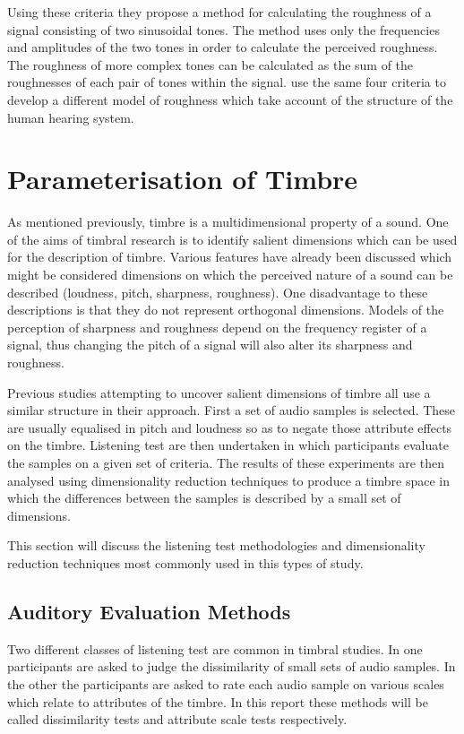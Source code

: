 	Using these criteria they propose a method for calculating the roughness of a signal consisting of two sinusoidal
	tones. The method uses only the frequencies and amplitudes of the two tones in order to calculate the perceived
	roughness. The roughness of more complex tones can be calculated as the sum of the roughnesses of each pair of tones
	within the signal. \citet{fastl2007psychoacoustics} use the same four criteria to develop a different model of
	roughness which take account of the structure of the human hearing system.

\section{Parameterisation of Timbre}
\label{sec:Timbre-Parameterisation}
	As mentioned previously, timbre is a multidimensional property of a sound. One of the aims of timbral research is to
	identify salient dimensions which can be used for the description of timbre. Various features have already been
	discussed which might be considered dimensions on which the perceived nature of a sound can be described (loudness,
	pitch, sharpness, roughness). One disadvantage to these descriptions is that they do not represent orthogonal
	dimensions. Models of the perception of sharpness and roughness depend on the frequency register of a signal, thus
	changing the pitch of a signal will also alter its sharpness and roughness.

	Previous studies attempting to uncover salient dimensions of timbre all use a similar structure in their approach.
	First a set of audio samples is selected. These are usually equalised in pitch and loudness so as to negate those
	attribute effects on the timbre. Listening test are then undertaken in which participants evaluate the samples on a
	given set of criteria. The results of these experiments are then analysed using dimensionality reduction techniques
	to produce a timbre space in which the differences between the samples is described by a small set of dimensions.

	This section will discuss the listening test methodologies and dimensionality reduction techniques most commonly
	used in this types of study.

	\subsection{Auditory Evaluation Methods}
	\label{sec:Timbre-AuditoryEvaluation}
		Two different classes of listening test are common in timbral studies. In one participants are asked to
		judge the dissimilarity of small sets of audio samples. In the other the participants are asked to rate each
		audio sample on various scales which relate to attributes of the timbre. In this report these methods will
		be called dissimilarity tests and attribute scale tests respectively.

